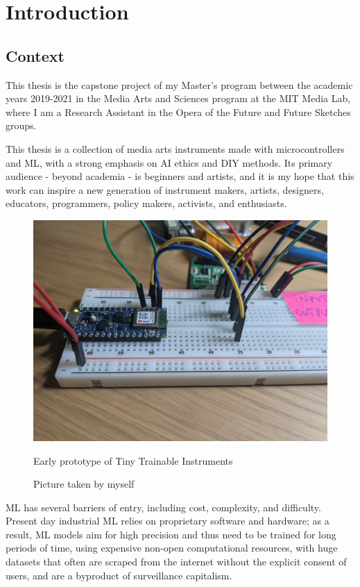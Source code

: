\chapter{Introduction}

\section{Context}

This thesis is the capstone project of my Master's program between the academic years 2019-2021 in the Media Arts and Sciences program at the MIT Media Lab, where I am a Research Assistant in the Opera of the Future and Future Sketches groups.

This thesis is a collection of media arts instruments made with microcontrollers and \acrfull{ML}, with a strong emphasis on \acrfull{AI} ethics and \acrfull{DIY} methods. Its primary audience - beyond academia - is beginners and artists, and it is my hope that this work can inspire a new generation of instrument makers, artists, designers, educators, programmers, policy makers, activists, and enthusiasts.

\begin{figure}[ht]
  \centering
  \includegraphics[width=0.75\linewidth,height=0.25\textheight,keepaspectratio]{images/tiny-trainable-instruments-early-protoype.jpg}
  \caption{Early prototype of Tiny Trainable Instruments}
  \caption*{Picture taken by myself}
  \label{fig:tiny-trainable-instruments-early-protoype}
\end{figure}

\acrshort{ML} has several barriers of entry, including cost, complexity, and difficulty. Present day industrial \acrshort{ML} relies on proprietary software and hardware; as a result, \acrshort{ML} models aim for high precision and thus need to be trained for long periods of time, using expensive non-open computational resources, with huge datasets that often are scraped from the internet without the explicit consent of users, and are a byproduct of surveillance capitalism.

